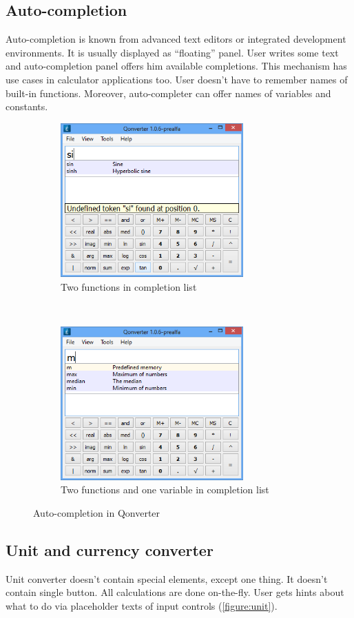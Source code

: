 \subsection{Auto-completion}
Auto-completion is known from advanced text editors or integrated development environments. It is usually displayed as \enquote{floating} panel. User writes some text and auto-completion panel offers him available completions. This mechanism has use cases in calculator applications too. User doesn't have to remember names of built-in functions. Moreover, auto-completer can offer names of variables and constants.

\begin{figure}[ht]
\centering
\begin{subfigure}[t]{0.48\textwidth}
\centering
\includegraphics[width=7cm]{graphics/real-world/08-complete1.png}
\caption{Two functions in completion list}
\end{subfigure}
~
\begin{subfigure}[t]{0.48\textwidth}
\centering
\includegraphics[width=7cm]{graphics/real-world/08-complete2.png}
\caption{Two functions and one variable in completion list}
\end{subfigure}
\caption{Auto-completion in Qonverter}\label{figure:autoq}
\end{figure}

\subsection{Unit and currency converter}
Unit converter doesn't contain special elements, except one thing. It doesn't contain single button. All calculations are done on-the-fly. User gets hints about what to do via placeholder texts of input controls (\autoref{figure:unit}).

